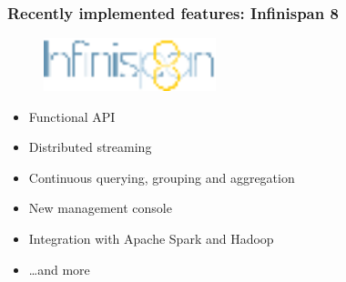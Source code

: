 \documentclass[10pt,utf8]{beamer}
\begin{document}
\begin{frame}
	\frametitle{Recently implemented features: Infinispan 8}
	\begin{figure}
		\centering
		\includegraphics[width=5cm]{./img/infinispan8.eps}
	\end{figure}
  \begin{itemize}
    \item Functional API
		\item Distributed streaming
		\item Continuous querying, grouping and aggregation
		\item New management console
		\item Integration with Apache Spark and Hadoop
		\item \dots and more
  \end{itemize}
\end{frame}

\end{document}
